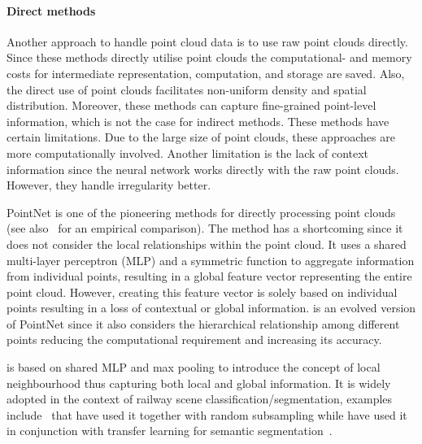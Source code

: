 \paragraph{Direct methods}
Another approach to handle point cloud data is to use raw point clouds directly. Since these methods directly utilise point clouds the com\-pu\-tat\-ion\-al- and memory costs for intermediate representation, computation, and storage are saved. Also, the direct use of point clouds facilitates non-uniform density and spatial distribution. Moreover, these methods can capture fine-grained point-level information, which is not the case for indirect methods. 
These methods have certain limitations. Due to the large size of point clouds, these approaches are more computationally involved. Another limitation is the lack of context information since the neural network works directly with the raw point clouds. However, they handle irregularity better. 

PointNet is one of the pioneering methods for directly processing point clouds~\cite{qi2017pointnet} (see also~\cite{guo2020deep} for an empirical comparison). The method has a shortcoming since it does not consider the local relationships within the point cloud. It uses a shared multi-layer perceptron (MLP) and a symmetric function to aggregate information from individual points, resulting in a global feature vector representing the entire point cloud. However, creating this feature vector is solely based on individual points resulting in a loss of contextual or global information. \pnpp{} is an evolved version of PointNet since it also considers the hierarchical relationship among different points reducing the computational requirement and increasing its accuracy.

\pnpp{} is based on shared MLP and max pooling to introduce the concept of local neighbourhood thus capturing both local and global information. It is widely adopted in the context of railway scene classification/segmentation, examples include~\cite{grandio2022point} that have used it together with random subsampling while \citeauthor{dibari2021semantic} have used it in conjunction with transfer learning for semantic segmentation~\cite{dibari2021semantic}. 
 
